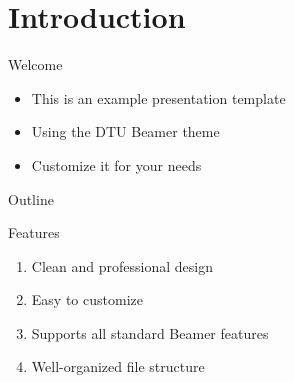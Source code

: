
\section{Introduction}

\begin{frame}{Welcome}
    \begin{itemize}
        \item This is an example presentation template
        \item Using the DTU Beamer theme
        \item Customize it for your needs
    \end{itemize}
\end{frame}

\begin{frame}{Outline}
    \tableofcontents
\end{frame}

\begin{frame}{Features}
    \begin{enumerate}
        \item Clean and professional design
        \item Easy to customize
        \item Supports all standard Beamer features
        \item Well-organized file structure
    \end{enumerate}
\end{frame}
